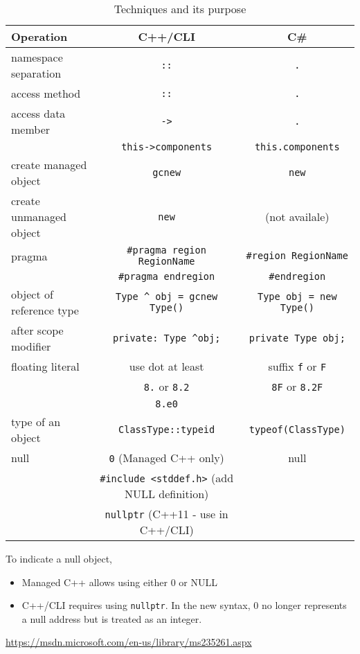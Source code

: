 \begin{table}[hbt]
\begin{center}
\caption{Techniques and its purpose}
\begin{tabular}{p{4cm}cc} 
\hline
Operation & C++/CLI & C\# \\
\hline\hline
namespace separation & \verb!::! & \verb!.! \\
access method & \verb!::! & \verb!.! \\
access data member & \verb!->!  & \verb!.! \\
 & \verb!this->components! & \verb!this.components! \\
create managed object & \verb!gcnew! & \verb!new! \\
create unmanaged object & \verb!new! & (not availale) \\ 
pragma & \verb!#pragma region RegionName! & \verb!#region RegionName! \\
 & \verb!#pragma endregion!   & \verb!#endregion! \\
object of reference type & \verb!Type ^ obj = gcnew Type()! & \verb!Type obj = new Type()! \\
after scope modifier & \verb!private: Type ^obj;! & \verb!private Type obj;! \\
floating literal & use dot at least & suffix \verb!f! or \verb!F! \\ 
      & \verb!8.! or \verb!8.2! & \verb!8F! or \verb!8.2F! \\
      & \verb!8.e0! & \\
type of an object & \verb!ClassType::typeid! & \verb!typeof(ClassType)! \\    
null & \verb!0! (Managed C++ only) & null \\
  & \verb!#include <stddef.h>! (add NULL definition) & \\
  & \verb!nullptr! (C++11 - use in C++/CLI) & \\   
\end{tabular}
\end{center}
\label{tab:compare_C++/CLI_Csharp}
\end{table}

To indicate a null object, 
\begin{itemize}
  \item Managed C++ allows using either 0 or NULL
  \item C++/CLI requires using \verb!nullptr!. 
  In the new syntax, 0 no longer represents a null address but is treated as an integer.
\end{itemize}
\url{https://msdn.microsoft.com/en-us/library/ms235261.aspx}

